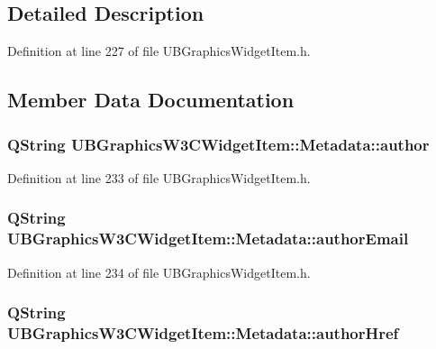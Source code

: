 \subsection{Detailed Description}


Definition at line 227 of file U\-B\-Graphics\-Widget\-Item.\-h.



\subsection{Member Data Documentation}
\hypertarget{class_u_b_graphics_w3_c_widget_item_1_1_metadata_a89bd4024f31e94fd1b5cbf1716b2957a}{
\subsubsection[{author}]{\setlength{\rightskip}{0pt plus 5cm}Q\-String U\-B\-Graphics\-W3\-C\-Widget\-Item\-::\-Metadata\-::author}}\label{d2/dea/class_u_b_graphics_w3_c_widget_item_1_1_metadata_a89bd4024f31e94fd1b5cbf1716b2957a}


Definition at line 233 of file U\-B\-Graphics\-Widget\-Item.\-h.

\hypertarget{class_u_b_graphics_w3_c_widget_item_1_1_metadata_ab31aec6e2eaf96adaa4a18c946103418}{
\subsubsection[{author\-Email}]{\setlength{\rightskip}{0pt plus 5cm}Q\-String U\-B\-Graphics\-W3\-C\-Widget\-Item\-::\-Metadata\-::author\-Email}}\label{d2/dea/class_u_b_graphics_w3_c_widget_item_1_1_metadata_ab31aec6e2eaf96adaa4a18c946103418}


Definition at line 234 of file U\-B\-Graphics\-Widget\-Item.\-h.

\hypertarget{class_u_b_graphics_w3_c_widget_item_1_1_metadata_a0af30b6e6c5004ecee71097573e1ec9a}{
\subsubsection[{author\-Href}]{\setlength{\rightskip}{0pt plus 5cm}Q\-String U\-B\-Graphics\-W3\-C\-Widget\-Item\-::\-Metadata\-::author\-Href}}\label{d2/dea/class_u_b_graphics_w3_c_widget_item_1_1_metadata_a0af30b6e6c5004ecee71097573e1ec9a}


